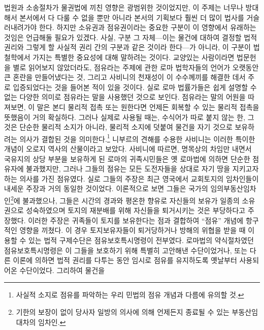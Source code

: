 법원과 소송절차가 물권법에 끼친 영향은 광범위한 것이었지만,
이 주제는 너무나 방대해서 본서에서 다 다룰 수 없을 뿐만 아니라
본서의 기획보다 훨씬 더 많이 법사를 거슬러내려가야 한다.
하지만 소유권과 점유권이라는 중요한 구분이 이 영향에서
유래하는 것임은 언급해둘 필요가 있겠다.
사실, 구분 그 자체---이는
물건에 대하여 결정할 법적 권리와
그렇게 할 사실적 권리 간의 구분과
같은 것이라 한다---가 아니라,
이 구분이 법철학에서 가지는 특별한 중요성에 대해 말하려는 것이다.
교양있는 사람이라면 법문헌을 별로 읽어보지 않았더라도,
점유라는 주제에 관한
로마 법학자들의 언어가 오랫동안 큰 혼란을 만들어냈다는 것,
그리고 사비니의 천재성이 이 수수께끼를 해결한 데서
주로 입증되었다는 것을
들어본 적이 있을 것이다.
실로 로마 법률가들은
쉽게 설명할 수 없는 다양한 의미로
점유라는 말을
사용했던 것으로 보인다.
점유라는 말의 어원을 따져보면, 이 말은 본디
물리적 접촉 또는
원한다면 언제든 회복할 수 있는 물리적 접촉을 뜻했음이 거의 확실하다.
그러나 실제로 사용될 때는,
수식어가 따로 붙지 않는 한,
그것은 단순한 물리적 소지가 아니라,
물리적 소지에 덧붙여
물건을 자기 것으로 보유하려는 의사가 결합된 것을
의미한다.\footnote{%
  사실적 소지로 점유를 파악하는 우리 민법의 점유 개념과 다름에 유의할 것.
  }
니부르의 견해를 수용한 사비니는
이러한 특이한 개념이 오로지 역사의 산물이라고 보았다.
사비니에 따르면,
명목상의 차임만 내면서
국유지의 상당 부분을
보유하게 된
로마의 귀족시민들은
옛 로마법에 의하면 단순한 점유자에
불과했지만, 그러나
그들의 점유는
모든 도전자들을 상대로 자기 땅을 지키고자 하는 의사를 가진 점유였다.
실로 그들의 주장은 최근 영국에서 교회토지의 임차인들이 내세운 주장과
거의 동일한 것이었다.
이론적으로 보면 그들은 국가의
임의부동산임차인\footnote{%
  기한의 보장이 없이
  당사자 일방의 의사에 의해 언제든지 종료될 수 있는 부동산임대차의 임차인.
}에 불과했으나,
그들은 시간의 경과와 평온한 향유로
자신들의 보유가 일종의 소유권으로 성숙하였으며
토지의 재분배를 위해 자신들을 퇴거시키는 것은 부당하다고 주장했다.
이러한 주장은 귀족들이 토지를 보유한다는 점과 결합하여
``점유'' 개념에 항구적인 영향을 끼쳤다.
이 경우
토지보유자들이
퇴거당하거나 방해의 위협을 받을 때
이용할 수 있는 법적 구제수단은
점유보호특시명령이 전부였다.
로마법의 약식절차였던 점유보호특시명령은
이 그들을 보호하기 위해 특별히 고안해낸 수단이었거나,
또는 다른 이론에 의하면
법적 권리를 다투는 동안 임시로 점유를 유지하도록 옛날부터 사용되어온
수단이었다.
그리하여 물건을 
